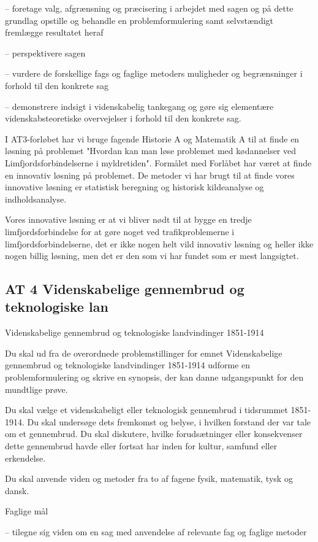\documentclass{article}
\begin{document}
– foretage valg, afgrænsning og præcisering i arbejdet med sagen og på dette grundlag opstille og behandle en problemformulering samt selvstændigt fremlægge resultatet heraf

– perspektivere sagen

– vurdere de forskellige fags og faglige metoders muligheder og begrænsninger i forhold til den konkrete sag

– demonstrere indsigt i videnskabelig tankegang og gøre sig elementære videnskabsteoretiske overvejelser i forhold til den konkrete sag.

I AT3-forløbet har vi bruge fagende Historie A og Matematik A til at finde en løsning på problemet "Hvordan kan man løse problemet med kødannelser ved Limfjordsforbindelserne i myldretiden". Formålet med Forlåbet har været at finde en innovativ løsning på problemet. De metoder vi har brugt til at finde vores innovative løsning er statistisk beregning og historisk kildeanalyse og indholdsanalyse.

Vores innovative løsning er at vi bliver nødt til at bygge en tredje limfjordsforbindelse for at gøre noget ved trafikproblemerne i limfjordsforbindelserne, det er ikke nogen helt vild innovativ løsning og heller ikke nogen billig løsning, men det er den som vi har fundet som er mest langsigtet.

\subsection{AT 4 Videnskabelige gennembrud og teknologiske lan}

Videnskabelige gennembrud og teknologiske landvindinger 1851-1914

Du skal ud fra de overordnede problemstillinger for emnet Videnskabelige gennembrud og teknologiske landvindinger 1851-1914 udforme en problemformulering og skrive en synopsis, der kan danne udgangspunkt for den mundtlige prøve.

Du skal vælge et videnskabeligt eller teknologisk gennembrud i tidsrummet 1851-1914. Du skal undersøge dets fremkomst og belyse, i hvilken forstand der var tale om et gennembrud. Du skal diskutere, hvilke forudsætninger eller konsekvenser dette gennembrud havde eller fortsat har inden for kultur, samfund eller erkendelse.

Du skal anvende viden og metoder fra to af fagene fysik, matematik, tysk og dansk.

Faglige mål

– tilegne sig viden om en sag med anvendelse af relevante fag og faglige metoder
\end{document}
